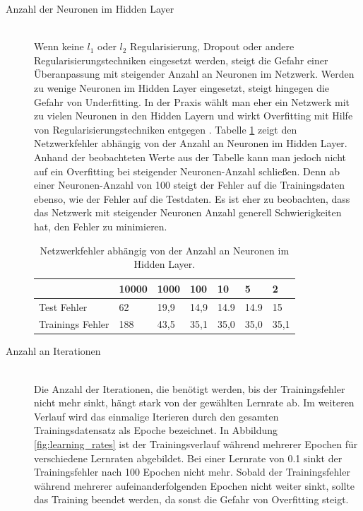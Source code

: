 \begin{description}
	\item[Anzahl der Neuronen im Hidden Layer]\hfill \\
	Wenn keine $l_1$ oder $l_2$ Regularisierung, Dropout \cite{dropout} oder andere Regularisierungstechniken eingesetzt werden, steigt die Gefahr einer Überanpassung mit steigender Anzahl an Neuronen im Netzwerk. Werden zu wenige Neuronen im Hidden Layer eingesetzt, steigt hingegen die Gefahr von Underfitting. In der Praxis wählt man eher ein Netzwerk mit zu vielen Neuronen in den Hidden Layern und wirkt Overfitting mit Hilfe von Regularisierungstechniken entgegen \cite{geron2017hands-on}. Tabelle \ref{table:overfitting} zeigt den Netzwerkfehler abhängig von der Anzahl an Neuronen im Hidden Layer. Anhand der beobachteten Werte aus der Tabelle kann man jedoch nicht auf ein Overfitting bei steigender Neuronen-Anzahl schließen. Denn ab einer Neuronen-Anzahl von 100 steigt der Fehler auf die Trainingsdaten ebenso, wie der Fehler auf die Testdaten. Es ist eher zu beobachten, dass das Netzwerk mit steigender Neuronen Anzahl generell Schwierigkeiten hat, den Fehler zu minimieren.
	\begin{table}[ht]
		\centering
		\begin{tabular}{l|llllll}
			& 10000 & 1000 & 100  & 10   & 5    & 2    \\ \hline
			Test Fehler      & 62    & 19,9 & 14,9 & 14.9 & 14.9 & 15   \\
			Trainings Fehler & 188   & 43,5 & 35,1 & 35,0 & 35,0 & 35,1
		\end{tabular}
		\caption{\label{table:overfitting}Netzwerkfehler abhängig von der Anzahl an Neuronen im Hidden Layer.}
	\end{table}
	
	\item[Anzahl an Iterationen]\hfill \\
	Die Anzahl der Iterationen, die benötigt werden, bis der Trainingsfehler nicht mehr sinkt, hängt stark von der gewählten Lernrate ab. Im weiteren Verlauf wird das einmalige Iterieren durch den gesamten Trainingsdatensatz als Epoche bezeichnet. In Abbildung \ref*{fig:learning_rates} ist der Trainingsverlauf während mehrerer Epochen für verschiedene Lernraten abgebildet. Bei einer Lernrate von 0.1 sinkt der Trainingsfehler nach 100 Epochen nicht mehr. Sobald der Trainingsfehler während mehrerer aufeinanderfolgenden Epochen nicht weiter sinkt, sollte das Training beendet werden, da sonst die Gefahr von Overfitting steigt.
	

\end{description}
